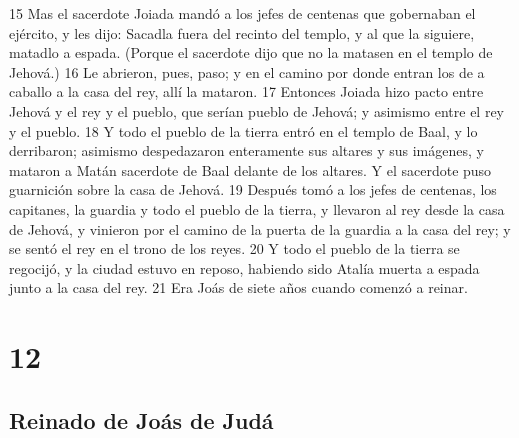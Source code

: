 15 Mas el sacerdote Joiada mandó a los jefes de centenas que gobernaban el ejército, y les dijo: Sacadla fuera del recinto del templo, y al que la siguiere, matadlo a espada. (Porque el sacerdote dijo que no la matasen en el templo de Jehová.)
16 Le abrieron, pues, paso; y en el camino por donde entran los de a caballo a la casa del rey, allí la mataron.
17 Entonces Joiada hizo pacto entre Jehová y el rey y el pueblo, que serían pueblo de Jehová; y asimismo entre el rey y el pueblo.
18 Y todo el pueblo de la tierra entró en el templo de Baal, y lo derribaron; asimismo despedazaron enteramente sus altares y sus imágenes, y mataron a Matán sacerdote de Baal delante de los altares. Y el sacerdote puso guarnición sobre la casa de Jehová.
19 Después tomó a los jefes de centenas, los capitanes, la guardia y todo el pueblo de la tierra, y llevaron al rey desde la casa de Jehová, y vinieron por el camino de la puerta de la guardia a la casa del rey; y se sentó el rey en el trono de los reyes.
20 Y todo el pueblo de la tierra se regocijó, y la ciudad estuvo en reposo, habiendo sido Atalía muerta a espada junto a la casa del rey.
21 Era Joás de siete años cuando comenzó a reinar.

\chapter{12}

\section*{Reinado de Joás de Judá}

